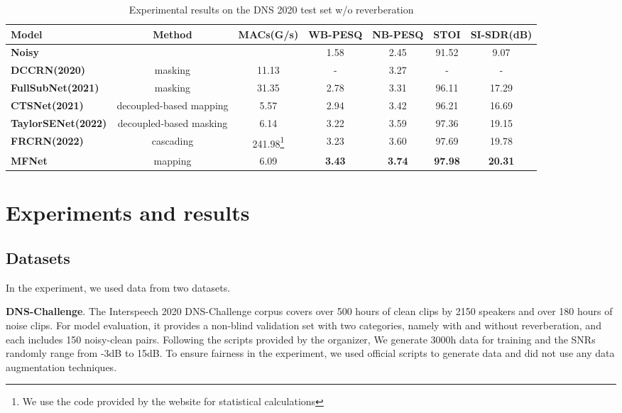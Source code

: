 \documentclass{INTERSPEECH2023}
\begin{document}
\begin{table*}[ht]
\caption{Experimental results on the DNS 2020 test set w/o reverberation}
\label{DNS table}
\centering
\begin{tabular}{@{}lcccccc@{}}
\toprule
\textbf{Model} &\textbf{Method}&  \textbf{MACs(G/s)} & \textbf{WB-PESQ} & \textbf{NB-PESQ} & \textbf{STOI} & \textbf{SI-SDR(dB)} \\ \midrule
\textbf{Noisy}     &              &       & 1.58 & 2.45  & 91.52 & 9.07  \\
\textbf{DCCRN(2020) \cite{hu2020dccrn}}  &masking    & 11.13 & -    & 3.27  & -     & -     \\
\textbf{FullSubNet(2021) \cite{hao2021fullsubnet}} & masking   & 31.35 & 2.78 & 3.31  & 96.11 & 17.29 \\
\textbf{CTSNet(2021) \cite{ctsnet}} & decoupled-based mapping   & 5.57    & 2.94 & 3.42 & 96.21 & 16.69 \\
\textbf{TaylorSENet(2022) \cite{li2022taylor}} & decoupled-based masking     & 6.14  & 3.22 & 3.59  & 97.36 & 19.15 \\
\textbf{FRCRN(2022) \cite{zhao2022frcrn}}   & cascading     & 241.98\footnote{We use the code provided by the website for statistical calculations}     & 3.23 & 3.60   & 97.69 & 19.78 \\
\midrule
\textbf{MFNet}   &mapping     & 6.09  & \textbf{3.43} &\textbf{ 3.74 } & \textbf{97.98} & \textbf{20.31}  \\ \bottomrule
\end{tabular}
\end{table*}




\section{Experiments and results}
\subsection{Datasets}

In the experiment, we used data from two datasets.

\textbf{DNS-Challenge}. The Interspeech 2020 DNS-Challenge corpus \cite{reddy2020interspeech} covers over 500 hours of clean clips by 2150 speakers and over 180 hours of noise clips. For model evaluation, it provides a non-blind validation set with two categories, namely with and without reverberation, and each includes 150 noisy-clean pairs. Following the scripts provided by the organizer, We generate 3000h data for training and the SNRs randomly range from -3dB to 15dB. To ensure fairness in the experiment, we used official scripts to generate data and did not use any data augmentation techniques. 
\end{document}
